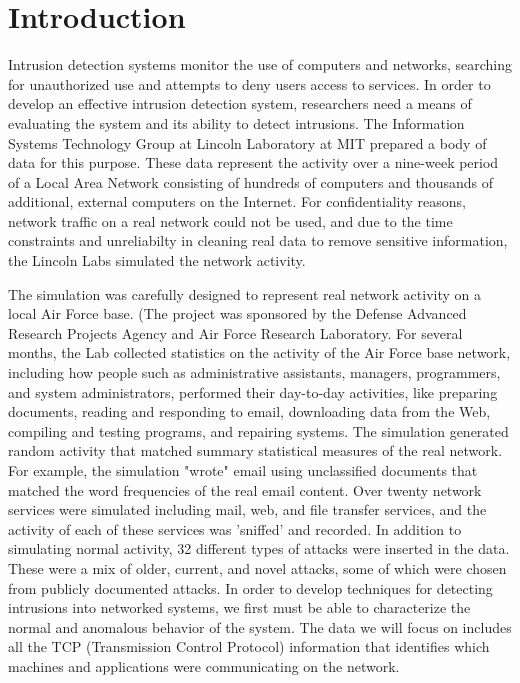 
\section{Introduction}

Intrusion detection systems monitor the use of computers and networks, 
searching for unauthorized use and attempts to deny users access to services.
In order to develop an effective intrusion detection system, 
researchers need a means of evaluating the system and its ability to detect 
intrusions.  
The Information Systems Technology Group at Lincoln Laboratory at MIT 
prepared a body of data for this purpose.  
These data represent the activity over a nine-week period of a 
Local Area Network consisting of hundreds of computers and thousands of 
additional, external computers on the Internet.
For confidentiality reasons, network traffic on a real network could
not be used, and due to the time constraints and unreliabilty in cleaning
real data to remove sensitive information, the Lincoln Labs simulated 
the network activity. 

The simulation was carefully designed to represent real network activity
on a local Air Force base.  (The project was sponsored by the Defense Advanced 
Research Projects Agency and Air Force Research Laboratory.
For several months, the Lab collected 
statistics on the activity of the Air Force base network, including
how people such as administrative assistants, managers, programmers,
and system administrators, performed their day-to-day activities, like 
preparing documents, reading and responding to email, downloading data 
from the Web, compiling and testing programs, and repairing systems.
The simulation generated random activity that matched summary statistical
measures of the real network.  For example, the simulation "wrote" email 
using unclassified documents that matched the word frequencies of the 
real email content.  Over twenty network services were simulated
including mail, web, and file transfer services, and the activity of 
each of these services was 'sniffed' and recorded. 
In addition to simulating normal activity, 32 different types of 
attacks were inserted in the data. These were a mix of older,
current, and novel attacks, some of which were chosen from publicly
documented attacks.
In order to develop techniques for detecting intrusions into networked 
systems, we first must be able to characterize the normal and anomalous
behavior of the system.
The data we will focus on includes all the TCP (Transmission Control Protocol) 
information that identifies which machines and applications were communicating
on the network.  


